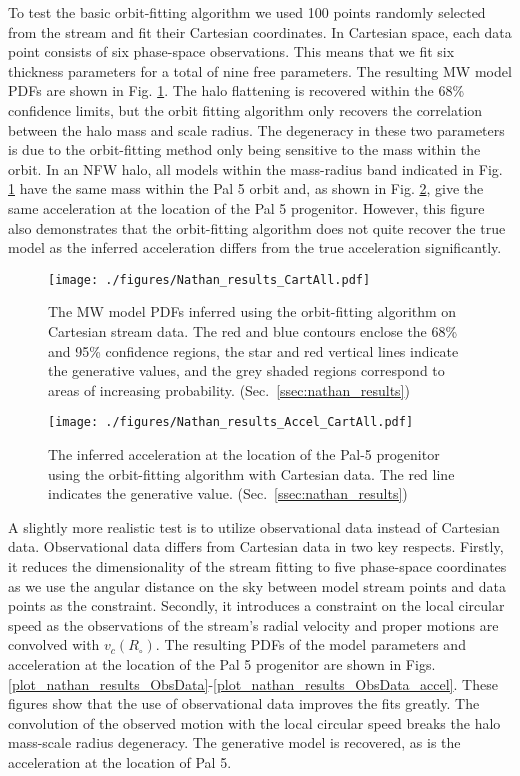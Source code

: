 To test the basic orbit-fitting algorithm we used 100 points randomly selected from the stream and fit their 
Cartesian coordinates.  In Cartesian space, each data point consists of six phase-space observations.  This means 
that we fit six thickness parameters for a total of nine free parameters.  The resulting MW model PDFs are shown in 
Fig. \ref{plot_nathan_results_Cart}.  The halo flattening is recovered within the 68\% confidence limits, but the orbit
fitting algorithm only recovers the correlation between the  halo mass and scale radius.  The degeneracy in these 
two parameters is due to the orbit-fitting method only being sensitive to the mass within the orbit.  In an NFW halo, 
all models within the mass-radius band indicated in Fig. \ref{plot_nathan_results_Cart} have the same 
mass within the Pal 5 orbit and, as shown in Fig. \ref{plot_nathan_results_Cart_accel}, give the same acceleration at the location 
of the Pal 5 progenitor.  However, this figure also demonstrates that the orbit-fitting algorithm does not quite 
recover the true model as the inferred acceleration differs from the true acceleration significantly.

\begin{figure}
\texttt{[image: ./figures/Nathan\_results\_CartAll.pdf]}
  \caption{The MW model PDFs inferred using the orbit-fitting algorithm on Cartesian stream data.  The red and blue 
  contours enclose the 68\% and 95\% confidence regions, the star and red vertical lines indicate 
  the generative values, and the grey shaded regions correspond to areas of increasing 
  probability.  (Sec.~\ref{ssec:nathan_results})}
  \label{plot_nathan_results_Cart}
\end{figure}

\begin{figure}
\texttt{[image: ./figures/Nathan\_results\_Accel\_CartAll.pdf]}
  \caption{The inferred acceleration at the location of the Pal-5 progenitor using the 
  orbit-fitting algorithm with Cartesian data.  The red line indicates the generative value.  (Sec.~\ref{ssec:nathan_results})}
  \label{plot_nathan_results_Cart_accel}
\end{figure}


A slightly more realistic test is to utilize observational data instead of Cartesian data.  Observational data differs from Cartesian 
data in two key respects.  Firstly, it reduces the dimensionality of the stream fitting to five phase-space coordinates as 
we use the angular distance on the sky between model stream points and data points as the constraint.  Secondly, it introduces 
a constraint on the local circular speed as the observations of the stream's radial velocity and proper motions are 
convolved with $v_{c}(R_{\circ})$.  The resulting PDFs of the model parameters and acceleration at the location of the 
Pal 5 progenitor are shown in Figs. \ref{plot_nathan_results_ObsData}-\ref{plot_nathan_results_ObsData_accel}.
These figures show that the use of observational data improves the fits greatly.  The convolution of the observed
motion with the local circular speed breaks the halo mass-scale radius degeneracy.  The generative model is recovered, as 
is the acceleration at the location of Pal 5.


